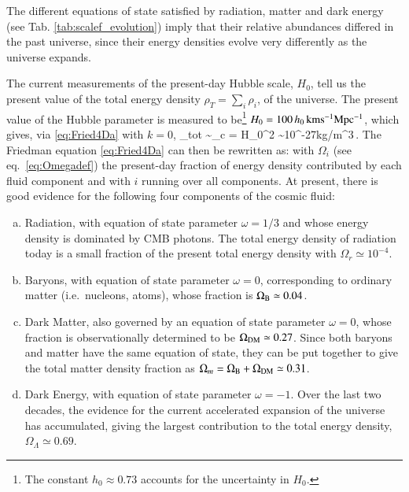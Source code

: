 The different equations of state satisfied by radiation, matter and dark energy (see Tab. \ref{tab:scalef_evolution}) imply that their relative abundances differed in the past universe, since their energy densities evolve very differently as the universe expands.

The current measurements of the present-day Hubble scale, $H_0$, tell us the present value of the total energy density $\rho_T=\sum_i\rho_i$, of the universe. The present value of the Hubble parameter is measured to be\footnote{The constant $h_0 \approx 0.73$ accounts for the uncertainty in $H_0$.} $H_0=100\,h_0\,{\rm km s^{-1}Mpc^{-1}} $, which gives, via \eqref{eq:Fried4Da} with $k=0$,
\be
\rho_{\rm tot} \sim \rho_{\rm c} = H_0^2 \sim 10^{-27}{\rm kg/m^3}\,.
\ee
The Friedman equation \eqref{eq:Fried4Da} can then be rewritten as:
\be
\setlength\fboxsep{0.25cm}
\setlength\fboxrule{0.4pt}
\ee
with $\Omega_i$ (see eq.~\eqref{eq:Omegadef}) the present-day fraction of energy density contributed by each fluid component and with $i$ running over all components. At present, there is good evidence for the following four components of the cosmic fluid:
\begin{enumerate}[a)]
\item  Radiation, with equation of state parameter $\omega=1/3$ and whose energy density is dominated by CMB photons. The total energy density of radiation today is a small fraction of the present total energy density with $\Omega_r \simeq10^{-4}$.

\item  Baryons, with equation of state parameter $\omega=0$, corresponding to ordinary matter (i.e.~nucleons, atoms), whose fraction is $\Omega_{\rm B} \simeq 0.04$.

\item Dark Matter, also governed by an equation of state parameter $\omega=0$, whose fraction is observationally determined to be
$\Omega_{\rm DM} \simeq 0.27$. Since both baryons and matter have the same equation of state, they can be put together to give the total matter density fraction as $\Omega_m=\Omega_{\rm B}+\Omega_{\rm DM} \simeq 0.31$.

\item Dark Energy, with equation of state parameter $\omega=-1$. Over the last two decades, the evidence for the current accelerated expansion of the universe has accumulated, giving the largest contribution to the total energy density, $\Omega_\Lambda \simeq 0.69$.

\end{enumerate}

